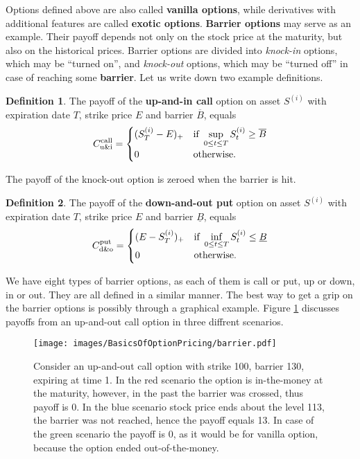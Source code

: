 \documentclass[a4paper,11pt, twoside]{book}
\theoremstyle{definition}
\newtheorem{mydef}{Definition}[chapter]
\theoremstyle{remark}
\begin{document}
Options defined above are also called \textbf{vanilla options}, while derivatives with additional features are called \textbf{exotic options}. \textbf{Barrier options} may serve as an example. Their payoff depends not only on the stock price at the maturity, but also on the historical prices. Barrier options are divided into \textit{knock-in} options, which may be ``turned on'', and \textit{knock-out} options, which may be ``turned off'' in case of reaching some \textbf{barrier}. Let us write down two example definitions.
\begin{mydef}
The payoff of the \textbf{up-and-in call} option on asset $S^{(i)}$ with expiration date $T$, strike price $E$ and barrier $\overline{B}$, equals
\[ C^{\hbox{\scriptsize call}}_{\hbox{\scriptsize u\&i}} = 
\begin{cases}
 (S^{(i)}_T - E)_+    & \hbox{if } \sup\limits_{0 \leq t \leq T} S^{(i)}_t \geq \overline{B}\\
 0                    & \hbox{otherwise.}
\end{cases}
\]
\end{mydef}
\noindent The payoff of the knock-out option is zeroed when the barrier is hit.
\begin{mydef}
The payoff of the \textbf{down-and-out put} option on asset $S^{(i)}$ with expiration date $T$, strike price $E$ and barrier $\underline{B}$, equals
\[ C^{\hbox{\scriptsize put}}_{\hbox{\scriptsize d\&o}} = 
\begin{cases}
 (E - S^{(i)}_T)_+    & \hbox{if } \inf\limits_{0 \leq t \leq T} S^{(i)}_t \leq \underline{B}\\
 0                    & \hbox{otherwise.}
\end{cases}
\]
\end{mydef}
We have eight types of barrier options, as each of them is call or put, up or down, in or out. They are all defined in a similar manner. The best way to get a grip on the barrier options is possibly through a graphical example. Figure \ref{fig:barrier} discusses payoffs from an up-and-out call option in three diffrent scenarios. 
\begin{figure}[!ht]
\centering
 \texttt{[image: images/BasicsOfOptionPricing/barrier.pdf]}
\caption{Consider an up-and-out call option with strike 100, barrier 130, expiring at time 1. In the red scenario the option is in-the-money at the maturity, however, in the past the barrier was crossed, thus payoff is 0. In the blue scenario stock price ends about the level 113, the barrier was not reached, hence the payoff equals 13. In case of the green scenario the payoff is 0, as it would be for vanilla option, because the option ended out-of-the-money. }
\label{fig:barrier}
\end{figure}
\end{document}
